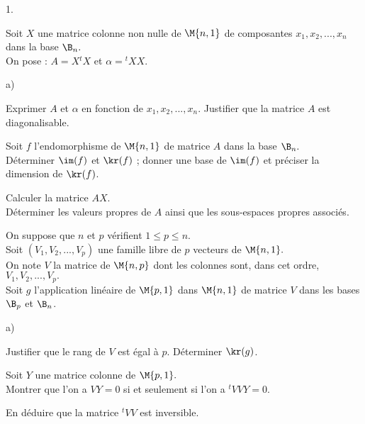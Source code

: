 \documentclass[11pt]{article}%
\begin{document}
\begin{noliste}{1.}
 \setlength{\itemsep}{4mm}
 \item Soit $X$ une matrice colonne non nulle de 
 $\M{n,1}$ de composantes $x_1,x_2,...,x_n$ dans la base 
 $\B_n.$\\
 On pose : $A=X{}^{t}{}{X}$ et $\alpha = {}^{t}{}{X}X.$
 \begin{noliste}{a)}
  \setlength{\itemsep}{2mm}
  \item Exprimer $A$ et $\alpha$ en fonction de $x_1,x_2,...,x_n$.
  Justifier que la matrice $A$ est diagonalisable.
  
  


  \item Soit $f$ l'endomorphisme de $\M{n,1}$ de matrice $A$ dans la 
  base $\B_n.$\\
  Déterminer $\im(f)$ et $\kr(f)$ ; donner une base de 
  $\im(f)$ et préciser la dimension de $\kr(f)$.
  
  

  
  \item Calculer la matrice $AX$. \\
  Déterminer les valeurs propres de $A$ 
  ainsi que les sous-espaces propres associés.
  
  
 \end{noliste}
 
 
 
 
 
 
 
 
 \item On suppose que $n$ et $p$ vérifient $1 \leq p \leq n$.\\
 Soit $(V_1,V_2,...,V_p)$ une famille libre de $p$ vecteurs de 
 $\M{n,1}.$\\
 On note $V$ la matrice de $\M{n,p}$ dont les colonnes sont, dans cet 
 ordre, $V_1,V_2,...,V_p.$\\
 Soit $g$ l'application linéaire de $\M{p,1}$ dans $\M{n,1}$ de matrice 
 $V$ dans les bases $\B_p$ et $\B_n$.
 \begin{noliste}{a)}
  \setlength{\itemsep}{2mm}
  \item Justifier que le rang de $V$ est égal à $p$. Déterminer 
  $\kr(g)$.
  
  
  
  \item Soit $Y$ une matrice colonne de $\M{p,1}.$\\
  Montrer que l'on a $VY=0$ si et seulement si l'on a ${}^t{}VVY=0$.
  
  
  
  
  
  
  
  
  
  \item En déduire que la matrice ${}^t{}VV$ est inversible.
  
  
 \end{noliste}
\end{noliste}
\end{document}

